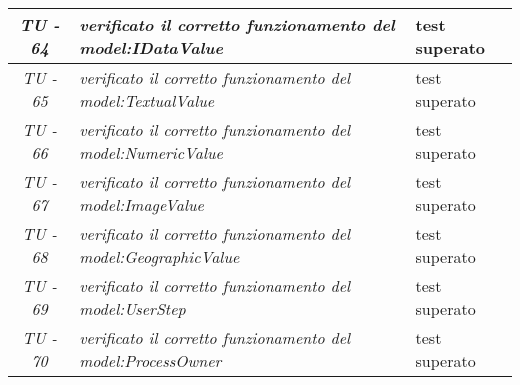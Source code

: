 \begin{small}\centering
\begin{tabular}{|c|p{8.0cm}|p{2.0cm}|}
\textit{TU - 64} &
\textit{verificato il corretto funzionamento del model:IDataValue} & test superato \\
\hline

\textit{TU - 65} &
\textit{verificato il corretto funzionamento del model:TextualValue} & test superato \\
\hline

\textit{TU - 66} &
\textit{verificato il corretto funzionamento del model:NumericValue} & test superato \\
\hline

\textit{TU - 67} &
\textit{verificato il corretto funzionamento del model:ImageValue} & test superato \\
\hline

\textit{TU - 68} &
\textit{verificato il corretto funzionamento del model:GeographicValue} & test superato \\
\hline

\textit{TU - 69} &
\textit{verificato il corretto funzionamento del model:UserStep} & test superato \\
\hline

\textit{TU - 70} &
\textit{verificato il corretto funzionamento del model:ProcessOwner} & test superato \\
\hline
\end{tabular}\\
\end{small}
